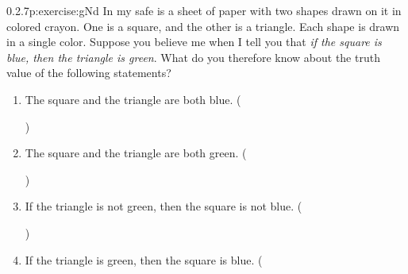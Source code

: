 \documentclass[twoside,11pt,]{book}
\numberwithin{equation}{chapter}
\begin{document}
\begin{divisionsolution}{0.2.7}{}{p:exercise:gNd}%
In my safe is a sheet of paper with two shapes drawn on it in colored crayon. One is a square, and the other is a triangle. Each shape is drawn in a single color. Suppose you believe me when I tell you that \emph{if the square is blue, then the triangle is green}. What do you therefore know about the truth value of the following statements?%
\begin{enumerate}[label=(\alph*)]
\item{}The square and the triangle are both blue. \quad()\quad
%
\item{}The square and the triangle are both green. \quad()\quad
%
\item{}If the triangle is not green, then the square is not blue. \quad()\quad
%
\item{}If the triangle is green, then the square is blue. \quad(
\end{enumerate}
\end{divisionsolution}
\end{document}
